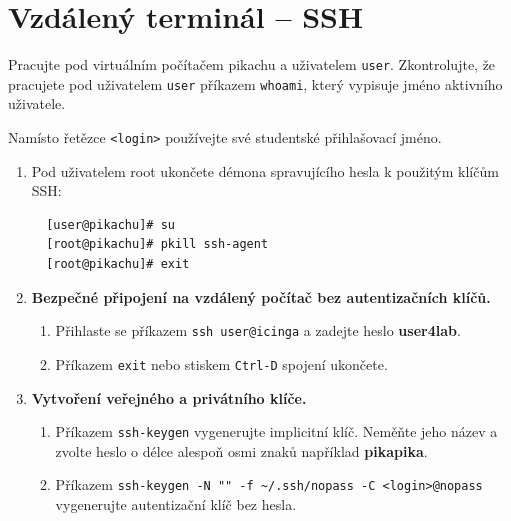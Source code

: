 \newpage
\section{Vzdálený terminál -- SSH}

Pracujte pod virtuálním počítačem pikachu a uživatelem {\tt user}. Zkontrolujte, že pracujete pod
uživatelem {\tt user} příkazem {\tt whoami}, který vypisuje jméno aktivního
uživatele.

Namísto řetězce {\tt <login>} používejte své studentské přihlašovací jméno.

\begin{enumerate}

  \item Pod uživatelem root ukončete démona spravujícího hesla k použitým klíčům SSH: 
  \begin{lstlisting}
  [user@pikachu]# su
  [root@pikachu]# pkill ssh-agent
  [root@pikachu]# exit
  \end{lstlisting}

  \item {\bf Bezpečné připojení na vzdálený počítač bez autentizačních klíčů.}

    \begin{enumerate}

      \item Přihlaste se příkazem {\tt ssh user@icinga} a zadejte heslo \textbf{user4lab}.

      \item Příkazem {\tt exit} nebo stiskem {\tt Ctrl-D} spojení ukončete.

    \end{enumerate}

  \item {\bf Vytvoření veřejného a privátního klíče.}

    \begin{enumerate}

      \item Příkazem {\tt ssh-keygen} vygenerujte implicitní klíč. Neměňte jeho
        název a zvolte heslo o délce alespoň osmi znaků například \textbf{pikapika}.

      \item Příkazem \verb|ssh-keygen -N "" -f ~/.ssh/nopass -C <login>@nopass| vygenerujte autentizační klíč bez hesla.


\end{enumerate}
\end{enumerate}

